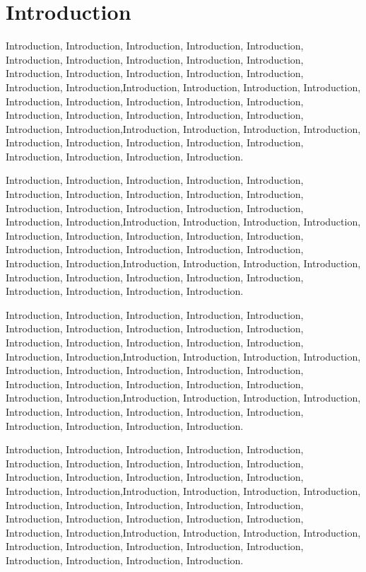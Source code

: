 
\chapter{Introduction}
\label{chap:introduction}

Introduction, Introduction, Introduction, Introduction, Introduction, Introduction, Introduction, Introduction, Introduction, Introduction, Introduction, Introduction, Introduction, Introduction, Introduction, Introduction, Introduction,Introduction, Introduction, Introduction, Introduction, Introduction, Introduction, Introduction, Introduction, Introduction, Introduction, Introduction, Introduction, Introduction, Introduction, Introduction, Introduction,Introduction, Introduction, Introduction, Introduction, Introduction, Introduction, Introduction, Introduction, Introduction, Introduction, Introduction, Introduction, Introduction.

Introduction, Introduction, Introduction, Introduction, Introduction, Introduction, Introduction, Introduction, Introduction, Introduction, Introduction, Introduction, Introduction, Introduction, Introduction, Introduction, Introduction,Introduction, Introduction, Introduction, Introduction, Introduction, Introduction, Introduction, Introduction, Introduction, Introduction, Introduction, Introduction, Introduction, Introduction, Introduction, Introduction,Introduction, Introduction, Introduction, Introduction, Introduction, Introduction, Introduction, Introduction, Introduction, Introduction, Introduction, Introduction, Introduction.

Introduction, Introduction, Introduction, Introduction, Introduction, Introduction, Introduction, Introduction, Introduction, Introduction, Introduction, Introduction, Introduction, Introduction, Introduction, Introduction, Introduction,Introduction, Introduction, Introduction, Introduction, Introduction, Introduction, Introduction, Introduction, Introduction, Introduction, Introduction, Introduction, Introduction, Introduction, Introduction, Introduction,Introduction, Introduction, Introduction, Introduction, Introduction, Introduction, Introduction, Introduction, Introduction, Introduction, Introduction, Introduction, Introduction.

Introduction, Introduction, Introduction, Introduction, Introduction, Introduction, Introduction, Introduction, Introduction, Introduction, Introduction, Introduction, Introduction, Introduction, Introduction, Introduction, Introduction,Introduction, Introduction, Introduction, Introduction, Introduction, Introduction, Introduction, Introduction, Introduction, Introduction, Introduction, Introduction, Introduction, Introduction, Introduction, Introduction,Introduction, Introduction, Introduction, Introduction, Introduction, Introduction, Introduction, Introduction, Introduction, Introduction, Introduction, Introduction, Introduction.

